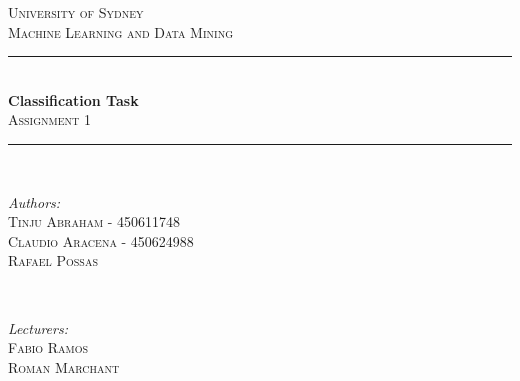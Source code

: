 \documentclass[letterpaper,10pt]{article}
\theoremstyle{mytheor}
\begin{document}
\begin{titlepage}

\newcommand{\HRule}{\rule{\linewidth}{0.5mm}} %

\center %
 

\textsc{\LARGE University of Sydney}\\[1.5cm] %

\textsc{\Large Machine Learning and Data Mining}\\[0.5cm] %


\HRule \\[0.4cm]
{ \huge \bfseries Classification Task}\\[0.4cm] %
\textsc{\Large Assignment 1}\\[0.5cm]
\HRule \\[1.5cm]
 

\begin{minipage}{0.4\textwidth}
\begin{flushleft} \large
\emph{Authors:}\\
\textsc{Tinju Abraham - 450611748\\		
		Claudio Aracena - 450624988\\
		Rafael Possas} %
\end{flushleft}
\end{minipage}
~
\begin{minipage}{0.4\textwidth}
\begin{flushright} \large
\emph{Lecturers:} \\
 \textsc{Fabio Ramos\\
 		 Roman Marchant} %
\end{flushright}
\end{minipage}\\[4cm]


\end{titlepage}
\end{document}
